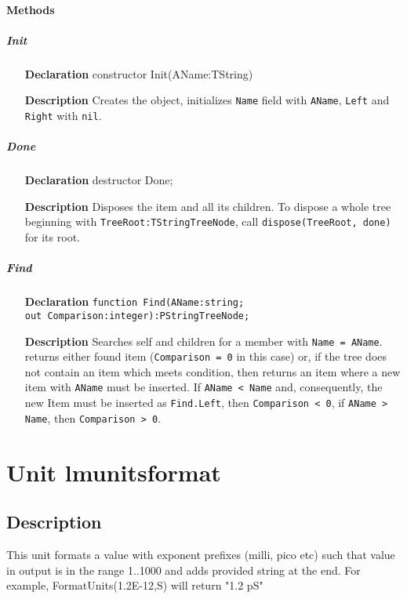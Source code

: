 \documentclass[12pt,a4paper,oneside]{report}
\newcommand{\lmath}[1]{   %
	\marginpar{\vspace{#1} 
		\begin{flushright}
			LMath
	\end{flushright} }
}
\newcommand{\declarationitem}[1]{\textbf{#1}}
\newcommand{\descriptiontitle}[1]{\textbf{#1}}
\newcommand{\code}[1]{\texttt{#1}}
\begin{document}
\paragraph{Methods\\}
\subparagraph{Init}
\begin{itemize}
\item[\declarationitem{Declaration}\hfill]constructor Init(AName:TString)
\item[\descriptiontitle{Description}]Creates the object, initializes \code{Name} field with \code{AName}, \code{Left} and \code{Right} with \code{nil}.
\end{itemize}
\subparagraph{Done}
\begin{itemize}
\item[\declarationitem{Declaration}\hfill] destructor Done;
\item[\descriptiontitle{Description}]Disposes the item and all its children. To dispose a whole tree beginning with \code{TreeRoot:TStringTreeNode}, call \code{dispose(TreeRoot, done)} for its root.
\end{itemize}
\subparagraph{Find}
\begin{itemize}
	\item[\declarationitem{Declaration}]\code{function Find(AName:string;\\{}\hspace*{2cm} out Comparison:integer):PStringTreeNode;}
	\item[\descriptiontitle{Description}] Searches self and children for a member with \code{Name = AName}. returns either found item (\code{Comparison = 0} in this case) or, if the tree does not contain an item which meets condition, then returns an item where a new item with \code{AName} must be inserted. If \code{AName < Name} and, consequently, the new Item must be inserted as \code{Find.Left}, then \code{Comparison < 0}, if \code{AName > Name}, then \code{Comparison > 0}.  
\end{itemize}
\section{Unit lmunitsformat}\lmath{-24pt}
\label{lmunitsformat}
\subsection{Description}
This unit formats a value with exponent prefixes (milli, pico etc) such that value in output is in the range 1..1000 and adds provided string at the end. For example, FormatUnits(1.2E{-}12,S) will return "1.2 pS"
\end{document}
